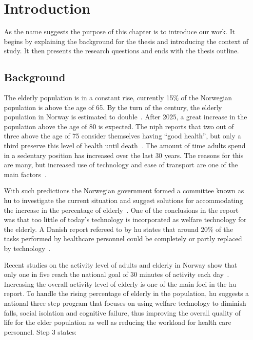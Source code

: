 \chapter{Introduction}
As the name suggests the purpose of this chapter is to introduce our work. It begins by explaining the background for the thesis and introducing the context of study. It then presents the research questions and ends with the thesis outline.

\section{Background}
The elderly population is in a constant rise, currently 15\% of the Norwegian population is above the age of 65. By the turn of the century, the elderly population in Norway is estimated to double~\cite{elder}. After 2025, a great increase in the population above the age of 80 is expected. The \gls{niph} reports that two out of three above the age of 75 consider themselves having ``good health'', but only a third preserve this level of health until death~\cite{elder}. The amount of time adults spend in a sedentary position has increased over the last 30 years. The reasons for this are many, but increased use of technology and ease of transport are one of the main factors~\cite{sedentaryBehaviour}.

With such predictions the Norwegian government formed a committee known as \gls{hu} to investigate the current situation and suggest solutions for accommodating the increase in the percentage of elderly~\cite{haagen}. One of the conclusions in the report was that too little of today's technology is incorporated as welfare technology for the elderly. A Danish report refereed to by \gls{hu} states that around 20\% of the tasks performed by healthcare personnel could be completely or partly replaced by technology~\cite{kmd}. 

Recent studies on the activity level of adults and elderly in Norway show that only one in five reach the national goal of 30 minutes of activity each day~\cite{fysiskAktivitet2009}. Increasing the overall activity level of elderly is one of the main foci in the \gls{hu} report. To handle the rising percentage of elderly in the population, \gls{hu} suggests a national three step program that focuses on using welfare technology to diminish falls, social isolation and cognitive failure, thus improving the overall quality of life for the elder population as well as reducing the workload for health care personnel. Step 3 states:

